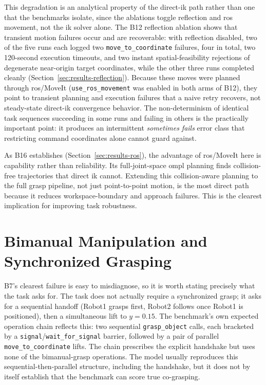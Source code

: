 \documentclass[
     12pt,
     a4paper,
     BCOR=10mm,
     DIV=14,
     listof=totoc,
     bibliography=totoc,
     parskip,
     twoside,
     headsepline
     ]{scrreprt}
\begin{document}
This degradation is an analytical property of the direct-\gls{ik} path rather than one that the benchmarks isolate, since the ablations toggle reflection and \gls{ros} movement, not the \gls{ik} solver alone. The B12 reflection ablation shows that transient motion failures occur and are recoverable: with reflection disabled, two of the five runs each logged two \texttt{move\_to\_coordinate} failures, four in total, two 120-second execution timeouts, and two instant spatial-feasibility rejections of degenerate near-origin target coordinates, while the other three runs completed cleanly (Section~\ref{sec:results-reflection}). Because these moves were planned through \gls{ros}/MoveIt (\texttt{use\_ros\_movement} was enabled in both arms of B12), they point to transient planning and execution failures that a naive retry recovers, not steady-state direct-\gls{ik} convergence behavior. The non-determinism of identical task sequences succeeding in some runs and failing in others is the practically important point: it produces an intermittent \textit{sometimes fails} error class that restricting command coordinates alone cannot guard against.

As B16 establishes (Section~\ref{sec:results-ros}), the advantage of \gls{ros}/MoveIt here is capability rather than reliability. Its full-joint-space \gls{ompl} planning finds collision-free trajectories that direct \gls{ik} cannot. Extending this collision-aware planning to the full grasp pipeline, not just point-to-point motion, is the most direct path because it reduces workspace-boundary and approach failures. This is the clearest implication for improving task robustness.

\section{Bimanual Manipulation and Synchronized Grasping}\label{sec:bimanual}
B7's clearest failure is easy to misdiagnose, so it is worth stating precisely what the task asks for. The task does not actually require a synchronized grasp; it asks for a sequential handoff (Robot1 grasps first, Robot2 follows once Robot1 is positioned), then a simultaneous lift to $y=0.15$. The benchmark's own expected operation chain reflects this: two sequential \texttt{grasp\_object} calls, each bracketed by a \texttt{signal}/\texttt{wait\_for\_signal} barrier, followed by a pair of parallel \texttt{move\_to\_coordinate} lifts. The chain prescribes the explicit handshake but uses none of the bimanual-grasp operations. The model usually reproduces this sequential-then-parallel structure, including the handshake, but it does not by itself establish that the benchmark can score true co-grasping.
\end{document}
